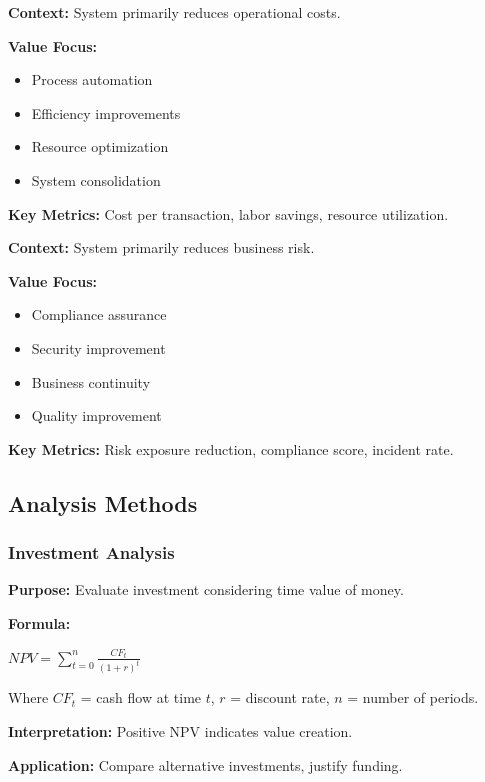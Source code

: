 \documentclass[11pt,letterpaper]{article}
\begin{document}
\begin{patternbox}
\textbf{Context:} System primarily reduces operational costs.

\textbf{Value Focus:}
\begin{itemize}[nosep]
    \item Process automation
    \item Efficiency improvements
    \item Resource optimization
    \item System consolidation
\end{itemize}

\textbf{Key Metrics:} Cost per transaction, labor savings, resource utilization.
\end{patternbox}

\begin{patternbox}
\textbf{Context:} System primarily reduces business risk.

\textbf{Value Focus:}
\begin{itemize}[nosep]
    \item Compliance assurance
    \item Security improvement
    \item Business continuity
    \item Quality improvement
\end{itemize}

\textbf{Key Metrics:} Risk exposure reduction, compliance score, incident rate.
\end{patternbox}

\subsection{Analysis Methods}

\subsubsection{Investment Analysis}

\begin{definitionbox}
\textbf{Purpose:} Evaluate investment considering time value of money.

\textbf{Formula:}
\begin{center}
$NPV = \sum_{t=0}^{n} \frac{CF_t}{(1+r)^t}$
\end{center}

Where $CF_t$ = cash flow at time $t$, $r$ = discount rate, $n$ = number of periods.

\textbf{Interpretation:} Positive NPV indicates value creation.

\textbf{Application:} Compare alternative investments, justify funding.
\end{definitionbox}
\end{document}
